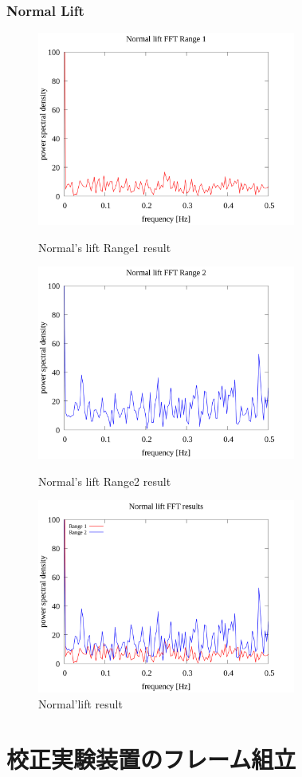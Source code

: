 \documentclass[twocolumn,a4j]{jsarticle}
\begin{document}
\subsubsection{Normal Lift}
\begin{figure}[htbp]
    \footnotesize
    \begin{center}
        \includegraphics[width=85mm]{../images/Normal_lift_06.png}
        \caption{Normal's lift Range1 result}
        \includegraphics[width=85mm]{../images/Normal_lift_07.png}
        \caption{Normal's lift Range2 result}
        \includegraphics[width=85mm]{../images/Normal_lift_08.png}
        \caption{Normal'lift result}
    \end{center}
\end{figure}
\newpage
\section{校正実験装置のフレーム組立}
\end{document}
